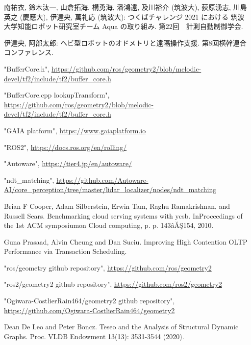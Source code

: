 \documentclass[a4paper]{jreport}	%
\begin{document}
\begin{thebibliography}{99}
 南祐衣, 鈴木汰一, 山倉拓海, 構勇海, 潘鴻遠, 及川裕介 (筑波大), 荻原湧志, 川島英之 (慶應大), 伊達央, 萬礼応 (筑波大): つくばチャレンジ 2021 における 筑波大学知能ロボット研究室チーム Aqua の取り組み. 第22回　計測自動制御学会.

 伊達央, 阿部太郎: ヘビ型ロボットのオドメトリと遠隔操作支援. 第8回横幹連合コンファレンス.

 "BufferCore.h", \url{https://github.com/ros/geometry2/blob/melodic-devel/tf2/include/tf2/buffer_core.h}

 "BufferCore.cpp lookupTransform", \url{https://github.com/ros/geometry2/blob/melodic-devel/tf2/include/tf2/buffer_core.h}

 "GAIA platform", \url{https://www.gaiaplatform.io}

 "ROS2", \url{https://docs.ros.org/en/rolling/}

 "Autoware", \url{https://tier4.jp/en/autoware/}

 "ndt\_matching", \url{https://github.com/Autoware-AI/core_perception/tree/master/lidar_localizer/nodes/ndt_matching}

 Brian F Cooper, Adam Silberstein, Erwin Tam, Raghu Ramakrishnan, and Russell Sears. Benchmarking cloud serving systems with ycsb. InProceedings of the 1st ACM symposiumon Cloud computing, p. p. 143âĂŞ154, 2010.

 Guna Prasaad, Alvin Cheung and Dan Suciu. Improving High Contention OLTP Performance via Transaction Scheduling. 

 "ros/geometry github repository", \url{https://github.com/ros/geometry2} 

 "ros2/geometry2 github repository", \url{https://github.com/ros2/geometry2}

 "Ogiwara-CostlierRain464/geometry2 github repository", \url{https://github.com/Ogiwara-CostlierRain464/geometry2}

 Dean De Leo and Peter Boncz. Teseo and the Analysis of Structural Dynamic Graphs. Proc. VLDB Endowment 13(13): 3531-3544 (2020).

\end{thebibliography}
\end{document}
